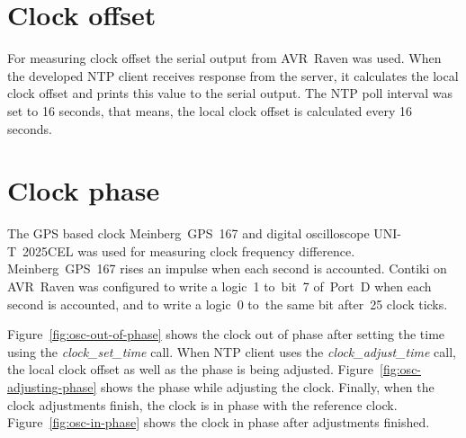 \section{Clock offset}
For measuring clock offset the serial output from AVR~Raven was used.
When the developed NTP client receives response from the server,
it calculates the local clock offset and prints this value to the serial output.
The NTP poll interval was set to 16 seconds, that means, the local clock offset
is calculated every 16 seconds.

\section{Clock phase}
The GPS based clock Meinberg~GPS~167 and digital oscilloscope UNI-T~2025CEL
was used for measuring clock frequency difference.
Meinberg~GPS~167 rises an impulse when each second is accounted.
Contiki on AVR~Raven was configured to write a logic~1
to~bit~7 of~Port~D when each second is accounted,
and to write a logic~0 to~the same bit after~25 clock ticks.

Figure~\ref{fig:osc-out-of-phase} shows the clock out of phase
after setting the time using the {\it{clock\_set\_time}} call.
When NTP client uses the {\it{clock\_adjust\_time}} call,
the local clock offset as well as the phase is being adjusted.
Figure~\ref{fig:osc-adjusting-phase} shows the phase while adjusting the clock.
Finally, when the clock adjustments finish, the clock is in phase with
the reference clock. Figure~\ref{fig:osc-in-phase} shows the clock in phase after adjustments finished.
